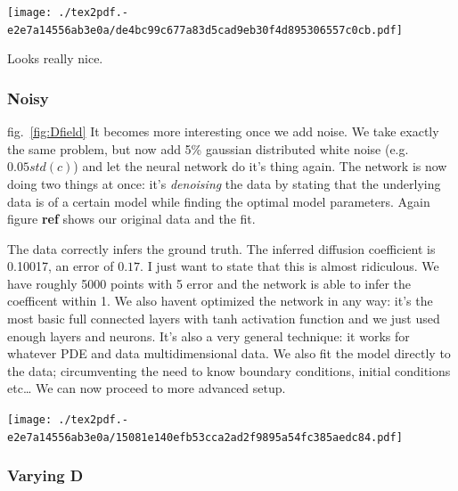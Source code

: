 \documentclass[12pt,a4paper,]{harvard-thesis}
\let\origfigure\figure
\let\endorigfigure\endfigure
\renewenvironment{figure}[1][2] {
    \expandafter\origfigure\expandafter[H]
} {
    \endorigfigure
}
\begin{document}
\begin{figure}
\hypertarget{fig:error_constantD}{%
\centering
\texttt{[image: ./tex2pdf.-e2e7a14556ab3e0a/de4bc99c677a83d5cad9eb30f4d895306557c0cb.pdf]}
\caption{Left panel: something. Right panel: something
else}\label{fig:error_constantD}
}
\end{figure}

Looks really nice.

\hypertarget{noisy}{%
\subsubsection*{Noisy}\label{noisy}}

fig.~\ref{fig:Dfield} It becomes more interesting once we add noise. We
take exactly the same problem, but now add 5\% gaussian distributed
white noise (e.g. \(0.05std(c)\)) and let the neural network do it's
thing again. The network is now doing two things at once: it's
\emph{denoising} the data by stating that the underlying data is of a
certain model while finding the optimal model parameters. Again figure
\textbf{ref} shows our original data and the fit.

The data correctly infers the ground truth. The inferred diffusion
coefficient is 0.10017, an error of \(0.17\). I just want to state that
this is almost ridiculous. We have roughly 5000 points with 5 error and
the network is able to infer the coefficent within 1. We also havent
optimized the network in any way: it's the most basic full connected
layers with tanh activation function and we just used enough layers and
neurons. It's also a very general technique: it works for whatever PDE
and data multidimensional data. We also fit the model directly to the
data; circumventing the need to know boundary conditions, initial
conditions etc\ldots{} We can now proceed to more advanced setup.

\begin{figure}
\hypertarget{fig:error_constantD_noisy}{%
\centering
\texttt{[image: ./tex2pdf.-e2e7a14556ab3e0a/15081e140efb53cca2ad2f9895a54fc385aedc84.pdf]}
\caption{Left panel: something. Right panel: something
else}\label{fig:error_constantD_noisy}
}
\end{figure}

\hypertarget{varying-d}{%
\subsubsection{Varying D}\label{varying-d}}
\end{document}
